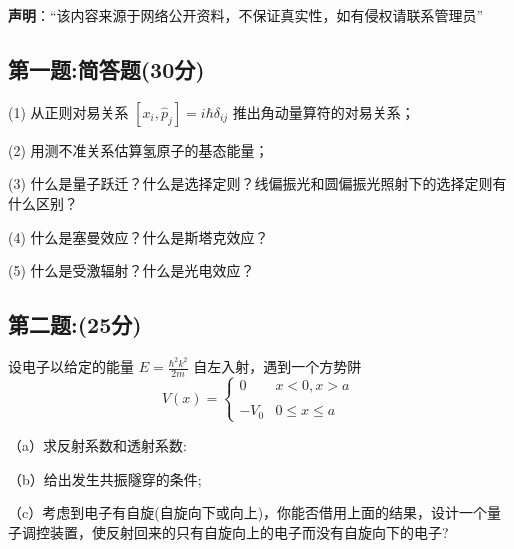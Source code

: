 
\textbf{声明}：“该内容来源于网络公开资料，不保证真实性，如有侵权请联系管理员”

\subsection{第一题:简答题(30分)}
(1) 从正则对易关系 $[x_i, \hat{p}_j] = i\hbar \delta_{ij}$ 推出角动量算符的对易关系；

(2) 用测不准关系估算氢原子的基态能量；

(3) 什么是量子跃迁？什么是选择定则？线偏振光和圆偏振光照射下的选择定则有什么区别？

(4) 什么是塞曼效应？什么是斯塔克效应？

(5) 什么是受激辐射？什么是光电效应？

\subsection{第二题:(25分)}
设电子以给定的能量 $E = \frac{\hbar^2 k^2}{2m}$ 自左入射，遇到一个方势阱
\[V(x) = \begin{cases} 0 & x < 0, x > a \\\\- V_0 & 0 \leq x \leq a\end{cases}~\]

（a）求反射系数和透射系数:

（b）给出发生共振隧穿的条件;

（c）考虑到电子有自旋(自旋向下或向上)，你能否借用上面的结果，设计一个量子调控装置，使反射回来的只有自旋向上的电子而没有自旋向下的电子?